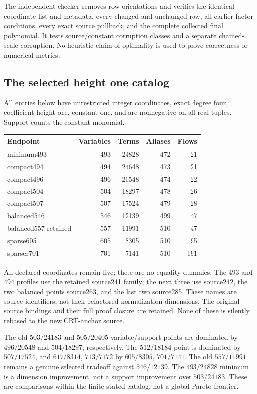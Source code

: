The independent checker removes row orientations and verifies the
identical coordinate list and metadata, every changed and unchanged row,
all earlier-factor conditions, every exact source pullback, and the
complete collected final polynomial. It tests source/constant corruption
classes and a separate chained-scale corruption. No heuristic claim of
optimality is used to prove correctness or numerical metrics.

\subsection{The selected height one catalog}
All entries below have unrestricted integer coordinates, exact degree
four, coefficient height one, constant one, and are nonnegative on all
real tuples. Support counts the constant monomial.
\begin{center}\small
\begin{tabular}{@{}lrrrr@{}}\toprule
Endpoint & Variables & Terms & Aliases & Flows\\\midrule
minimum493 &493&24828&472&21\\
compact494 &494&24648&473&21\\
compact496 &496&20548&474&22\\
compact504 &504&18297&478&26\\
compact507 &507&17524&479&28\\
balanced546 &546&12139&499&47\\
balanced557 retained &557&11991&510&47\\
sparse605 &605&8305&510&95\\
sparser701 &701&7141&510&191\\\bottomrule
\end{tabular}
\end{center}
All declared coordinates remain live; there are no equality dummies.
The 493 and 494 profiles use the retained source241 family; the next
three use source242, the two balanced points source263, and the last two
source285. These names are source identifiers, not their refactored
normalization dimensions. The original source bindings and their full
proof closure are retained. None of these is silently rebased to the
new CRT-anchor source.

The old $503/24183$ and $505/20405$ variable/support points are dominated
by $496/20548$ and $504/18297$, respectively. The $512/18184$ point is
dominated by $507/17524$, and $617/8314$, $713/7172$ by $605/8305$,
$701/7141$. The old $557/11991$ remains a genuine selected tradeoff
against $546/12139$. The $493/24828$ minimum is a dimension improvement,
not a support improvement over $503/24183$. These are comparisons within
the finite stated catalog, not a global Pareto frontier.
